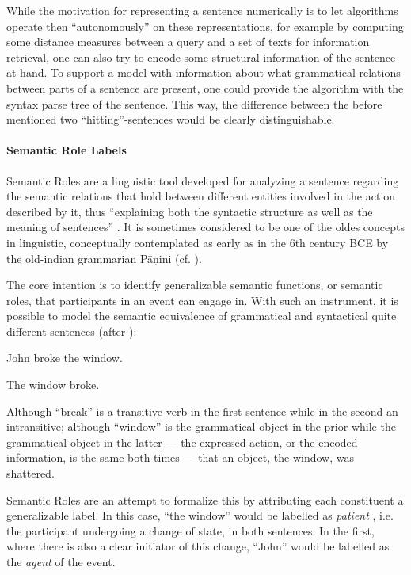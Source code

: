 While the motivation for representing a sentence numerically is to let algorithms operate
then ``autonomously'' on these representations, for example by computing some distance measures
between a query and a set of texts for information retrieval, one can also try to encode
some structural information of the sentence at hand.
To support a model with information about what grammatical relations between
parts of a sentence are present, one could provide the algorithm with the syntax parse
tree of the sentence. This way, the difference between the before mentioned
two ``hitting''-sentences would be clearly distinguishable.

\paragraph*{Semantic Role Labels}

Semantic Roles are a linguistic tool developed for analyzing a sentence regarding the
semantic relations that hold between different entities involved in the action described by
it, thus ``explaining both the syntactic structure as well as the meaning of sentences''
\cite{bussmann2006routledge}. It is sometimes considered to be one of the oldes concepts in
linguistic, conceptually contemplated as early as in the 6th century BCE by the old-indian
grammarian P\=a\d{n}ini (cf. \citep{gildea2002automatic}).

The core intention is to identify generalizable semantic functions, or semantic roles,
that participants in an event can engage in. With such an instrument, it is possible to
model the semantic equivalence of grammatical and syntactical quite different sentences
(after \cite{palmer2010semantic}):

\begin{examples}
  \item John broke the window.
  \item The window broke.
\end{examples}

Although ``break'' is a transitive verb in the first sentence while in the second an intransitive;
although ``window'' is the grammatical object in the prior while the grammatical object in the
latter --- the expressed action, or the encoded information, is the same both times --- that an
object, the window, was shattered.

Semantic Roles are an attempt to formalize this by attributing each constituent
a generalizable label. In this case, ``the window'' would be labelled as \emph{patient}
, i.e. the participant undergoing a change of state, in both sentences.
In the first, where there is also a clear initiator of this change, ``John''
would be labelled as the \emph{agent} of the event.

